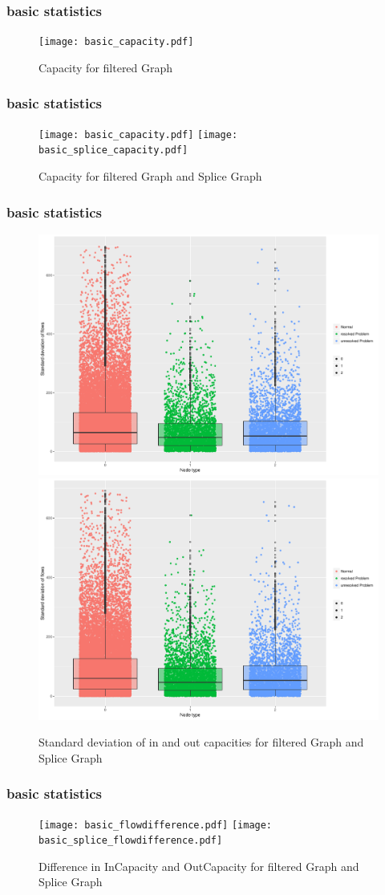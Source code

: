 \documentclass[10pt, compress]{beamer}
\begin{document}
\begin{frame}[fragile]
	\frametitle{basic statistics}
		\begin{figure}
			\texttt{[image: basic\_capacity.pdf]}
			\caption{Capacity for filtered Graph }
		\end{figure}

\end{frame}
\begin{frame}[fragile]
	\frametitle{basic statistics}
		\begin{figure}
			\texttt{[image: basic\_capacity.pdf]}
			\texttt{[image: basic\_splice\_capacity.pdf]}
			\caption{Capacity for filtered Graph and Splice Graph}
		\end{figure}

\end{frame}
\begin{frame}[fragile]
	\frametitle{basic statistics}
		\begin{figure}
			\includegraphics[width=0.49\linewidth]{basic_flowdeviation.pdf}
			\includegraphics[width=0.49\linewidth]{basic_splice_flowdeviation.pdf}
			\caption{Standard deviation of in and out capacities for filtered Graph and Splice Graph}
		\end{figure}

\end{frame}
\begin{frame}[fragile]
	\frametitle{basic statistics}
		\begin{figure}
			\texttt{[image: basic\_flowdifference.pdf]}
			\texttt{[image: basic\_splice\_flowdifference.pdf]}
			\caption{Difference in InCapacity and OutCapacity for filtered Graph and Splice Graph}
		\end{figure}

\end{frame}
\end{document}
